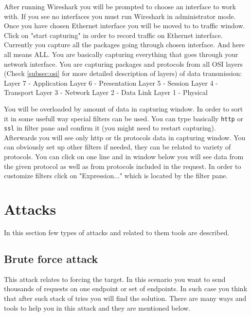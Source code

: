 \documentclass{article}[12pt]
\begin{document}
After running Wireshark you will be prompted to choose an interface to work with.
If you see no interfaces you must run Wireshark in administrator mode.
Once you have chosen Ethernet interface you will be moved to to traffic window.
Click on "start capturing" in order to record traffic on Ethernet interface.
Currently you capture all the packages going through chosen interface.
And here all means ALL.
You are basically capturing everything that goes through your network interface.
You are capturing packages and protocols from all OSI layers (Check \ref{subsec:osi} for more detailed description of layers) of data transmission: \newline \newline
Layer 7 - Application \newline
Layer 6 - Presentation \newline
Layer 5 - Session \newline
Layer 4 - Transport \newline
Layer 3 - Network \newline
Layer 2 - Data Link \newline
Layer 1 - Physical \newline


You will be overloaded by amount of data in capturing window.
In order to sort it in some usefull way special filters can be used.
You can type basically \texttt{http} or \texttt{ssl} in filter pane and confirm it (you might need to restart capturing).
Afterwards you will see only http or tls protocols data in capturing window.
You can obviously set up other filters if needed, they can be related to variety of protocols.
You can click on one line and in window below you will see data from the given protocol as well as from protocols included in the request.
In order to customize filters click on "Expression..." which is located by the filter pane.





\section{Attacks}

In this section few types of attacks and related to them tools are described.

\subsection{Brute force attack}
\label{subsec:bruteforce}
This attack relates to forcing the target.
In this scenario you want to send thousands of requests on one endpoint or set of endpoints.
In such case you think that after such stack of tries you will find the solution.
There are many ways and tools to help you in this attack and they are mentioned below.
\end{document}
